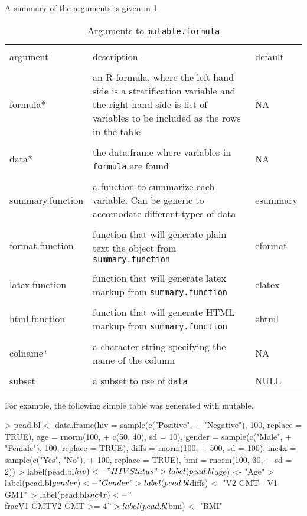 \documentclass{article}
\begin{document}
A summary of the arguments is given in \ref{ref:args}


\begin{table}
  \label{ref:args}
  \caption{Arguments to \texttt{mutable.formula}}
  \begin{tabular}{|p{3cm}|p{8cm}|p{3cm}|}
    \hline\\
    argument&description&default\\
    \hline\\
    formula* & an R formula, where the left-hand side is a stratification variable
    and the right-hand side is list of variables to be included as the rows in the table &
    NA\\
    &&\\
    data* & the data.frame where variables in \texttt{formula} are found & NA\\
    &&\\
    summary.function & a function to summarize each variable. Can be generic to accomodate 
    different types of data & esummary \\
    &&\\
    format.function & function that will generate plain text the object from \texttt{summary.function}
    & eformat\\
    &&\\
    latex.function & function that will generate latex markup from \texttt{summary.function} & elatex\\
    &&\\
    html.function & function that will generate HTML markup from \texttt{summary.function}& ehtml\\
    &&\\
    colname* & a character string specifying the name of the column& NA\\
    &&\\
    subset & a subset to use of \texttt{data}& NULL\\
    \hline
  \end{tabular}
\end{table}

For example, the following simple table was generated with mutable. 

\begin{Schunk}
\begin{Sinput}
> pead.bl <- data.frame(hiv = sample(c("Positive", 
+     "Negative"), 100, replace = TRUE), age = rnorm(100, 
+     c(50, 40), sd = 10), gender = sample(c("Male", 
+     "Female"), 100, replace = TRUE), diffs = rnorm(100, 
+     500, sd = 100), inc4x = sample(c("Yes", "No"), 
+     100, replace = TRUE), bmi = rnorm(100, 30, 
+     sd = 2))
> label(pead.bl$hiv) <- "HIV Status"
> label(pead.bl$age) <- "Age"
> label(pead.bl$gender) <- "Gender"
> label(pead.bl$diffs) <- "V2 GMT - V1 GMT"
> label(pead.bl$inc4x) <- "$\\frac{V1 GMT}{V2 GMT} >= 4$"
> label(pead.bl$bmi) <- "BMI"
\end{Sinput}
\end{Schunk}
\end{document}

